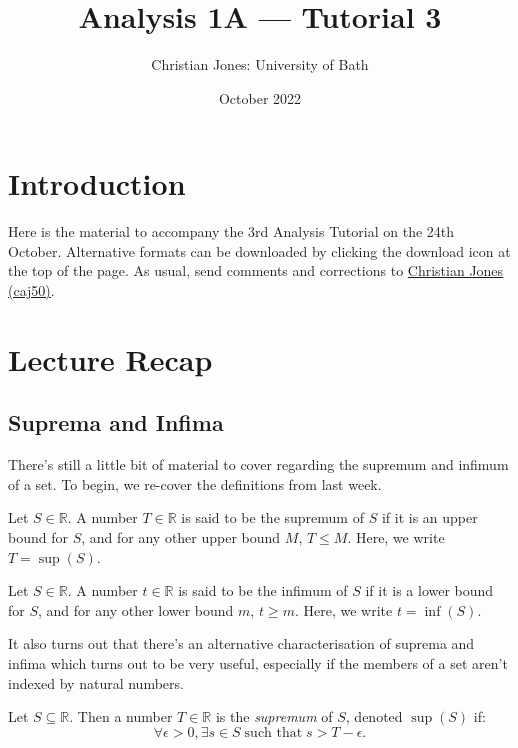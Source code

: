 \documentclass[
  10pt,
  a4paper]{article}
\title{Analysis 1A --- Tutorial 3}
\author{Christian Jones: University of Bath}
\date{October 2022}
\theoremstyle{plain}
\theoremstyle{definition}
\theoremstyle{plain}
\theoremstyle{plain}
\theoremstyle{plain}
\theoremstyle{plain}
\theoremstyle{definition}
\theoremstyle{definition}
\theoremstyle{remark}
\theoremstyle{remark}
\let\BeginKnitrBlock\begin \let\EndKnitrBlock\end
\begin{document}
\maketitle

{
\setcounter{tocdepth}{2}
\tableofcontents
}
\newpage
{}

\hypertarget{introduction}{%
\section*{Introduction}\label{introduction}}

Here is the material to accompany the 3rd Analysis Tutorial on the 24th October. Alternative formats can be downloaded by clicking the download icon at the top of the page. As usual, send comments and corrections to \href{mailto:caj50@bath.ac.uk}{Christian Jones (caj50)}.

\hypertarget{lecture-recap}{%
\section{Lecture Recap}\label{lecture-recap}}

\hypertarget{suprema-and-infima}{%
\subsection{Suprema and Infima}\label{suprema-and-infima}}

There's still a little bit of material to cover regarding the supremum and infimum of a set. To begin, we re-cover the definitions from last week.
\BeginKnitrBlock{definition}[Supremum]
{\label{def:def1} }Let \(S \in \mathbb{R}\). A number \(T \in \mathbb{R}\) is said to be the supremum of \(S\) if it is an upper bound for \(S\), and for any other upper bound \(M\), \(T \leq M\). Here, we write \(T = \sup(S)\).
\EndKnitrBlock{definition}

\BeginKnitrBlock{definition}[Infimum]
{\label{def:def2} }Let \(S \in \mathbb{R}\). A number \(t \in \mathbb{R}\) is said to be the infimum of \(S\) if it is a lower bound for \(S\), and for any other lower bound \(m\), \(t\geq m\). Here, we write \(t = \inf(S)\).
\EndKnitrBlock{definition}
It also turns out that there's an alternative characterisation of suprema and infima which turns out to be very useful, especially if the members of a set aren't indexed by natural numbers.

\BeginKnitrBlock{proposition}
{\label{prp:prop1} }Let \(S\subseteq\mathbb{R}\). Then a number \(T\in\mathbb{R}\) is the \emph{supremum} of \(S\), denoted \(\sup(S)\) if: \[\forall \epsilon > 0, \exists s \in S\; \text{such that} \; s > T - \epsilon.\]
\EndKnitrBlock{proposition}
\end{document}
